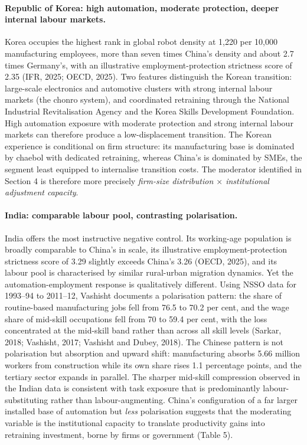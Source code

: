 \documentclass[12pt]{article}
\begin{document}
\paragraph{Republic of Korea: high automation, moderate protection, deeper internal labour markets.} Korea occupies the highest rank in global robot density at 1,220 per 10,000 manufacturing employees, more than seven times China's density and about 2.7 times Germany's, with an illustrative employment-protection strictness score of 2.35 (IFR, 2025; OECD, 2025). Two features distinguish the Korean transition: large-scale electronics and automotive clusters with strong internal labour markets (the chonro system), and coordinated retraining through the National Industrial Revitalisation Agency and the Korea Skills Development Foundation. High automation exposure with moderate protection and strong internal labour markets can therefore produce a low-displacement transition. The Korean experience is conditional on firm structure: its manufacturing base is dominated by chaebol with dedicated retraining, whereas China's is dominated by SMEs, the segment least equipped to internalise transition costs. The moderator identified in Section 4 is therefore more precisely \emph{firm-size distribution $\times$ institutional adjustment capacity}.

\paragraph{India: comparable labour pool, contrasting polarisation.} India offers the most instructive negative control. Its working-age population is broadly comparable to China's in scale, its illustrative employment-protection strictness score of 3.29 slightly exceeds China's 3.26 (OECD, 2025), and its labour pool is characterised by similar rural-urban migration dynamics. Yet the automation-employment response is qualitatively different. Using NSSO data for 1993--94 to 2011--12, Vashisht documents a polarisation pattern: the share of routine-based manufacturing jobs fell from 76.5 to 70.2 per cent, and the wage share of mid-skill occupations fell from 70 to 59.4 per cent, with the loss concentrated at the mid-skill band rather than across all skill levels (Sarkar, 2018; Vashisht, 2017; Vashisht and Dubey, 2018). The Chinese pattern is not polarisation but absorption and upward shift: manufacturing absorbs 5.66 million workers from construction while its own share rises 1.1 percentage points, and the tertiary sector expands in parallel. The sharper mid-skill compression observed in the Indian data is consistent with task exposure that is predominantly labour-substituting rather than labour-augmenting. China's configuration of a far larger installed base of automation but \emph{less} polarisation suggests that the moderating variable is the institutional capacity to translate productivity gains into retraining investment, borne by firms or government (Table 5).
\end{document}
